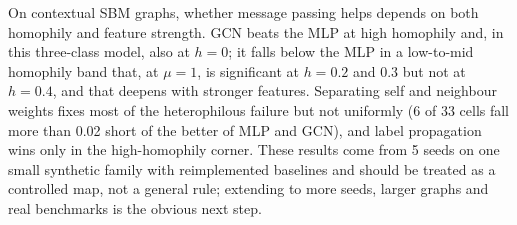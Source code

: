 On contextual SBM graphs, whether message passing helps depends on both homophily and feature strength. GCN beats the MLP at high homophily and, in this three-class model, also at $h=0$; it falls below the MLP in a low-to-mid homophily band that, at $\mu=1$, is significant at $h=0.2$ and $0.3$ but not at $h=0.4$, and that deepens with stronger features. Separating self and neighbour weights fixes most of the heterophilous failure but not uniformly (6 of 33 cells fall more than 0.02 short of the better of MLP and GCN), and label propagation wins only in the high-homophily corner. These results come from 5 seeds on one small synthetic family with reimplemented baselines and should be treated as a controlled map, not a general rule; extending to more seeds, larger graphs and real benchmarks is the obvious next step.

